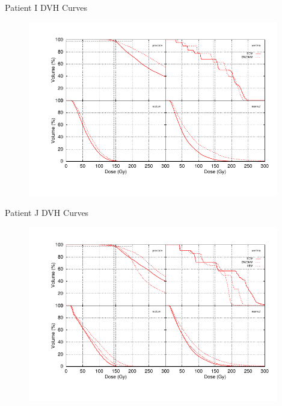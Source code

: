 \documentclass{beamer}
\begin{document}
\begin{frame}{Patient I DVH Curves}
  
  \begin{figure}[h!]
    \begin{center}
      \includegraphics[width=4.3in]{figures/oestreicher-all4x4.pdf}
    \end{center}
  \end{figure}

\end{frame}

\begin{frame}{Patient J DVH Curves}
  
  \begin{figure}[h!]
    \begin{center}
      \includegraphics[width=4.3in]{figures/olson_us-all4x4.pdf}
    \end{center}
  \end{figure}

\end{frame}
\end{document}

